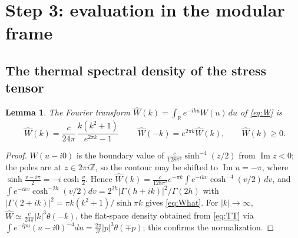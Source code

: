 \documentclass[11pt]{article}
\theoremstyle{accent}
\newtheorem{lemma}[theorem]{Lemma}
\theoremstyle{definition}
\newcommand{\Wh}{\widehat W}
\begin{document}
\section{Step 3: evaluation in the modular frame}\label{sec:step3}

\subsection{The thermal spectral density of the stress tensor}
\begin{lemma}\label{lem:What}
The Fourier transform \(\Wh(k)=\int_{\mathbb R}e^{-iku}W(u)\,du\) of \eqref{eq:W} is
\begin{equation}\label{eq:What}
 \boxed{\;\Wh(k)=\frac{c}{24\pi}\,\frac{k(k^2+1)}{e^{2\pi k}-1}\;}\qquad\Wh(-k)=e^{2\pi k}\Wh(k),\qquad \Wh(k)\ge0.
\end{equation}
\end{lemma}
\begin{proof}
\(W(u-i0)\) is the boundary value of \(\frac{c}{128\pi^2}\sinh^{-4}(z/2)\) from \(\operatorname{Im}z<0\); the poles are at \(z\in2\pi i\mathbb Z\), so the contour may be shifted to \(\operatorname{Im}u=-\pi\), where \(\sinh\frac{v-i\pi}{2}=-i\cosh\frac v2\).  Hence \(\Wh(k)=\frac{c}{128\pi^2}e^{-\pi k}\int e^{-ikv}\cosh^{-4}(v/2)\,dv\), and \(\int e^{-ikv}\cosh^{-2h}(v/2)dv=2^{2h}|\Gamma(h+ik)|^2/\Gamma(2h)\) with \(|\Gamma(2+ik)|^2=\pi k(k^2+1)/\sinh\pi k\) gives \eqref{eq:What}.  For \(|k|\to\infty\), \(\Wh\simeq\frac{c}{24\pi}|k|^3\theta(-k)\), the flat-space density obtained from \eqref{eq:TT} via \(\int e^{-ipu}(u-i0)^{-4}du=\frac{2\pi}{3!}|p|^3\theta(\mp p)\); this confirms the normalization.
\end{proof}
\end{document}
